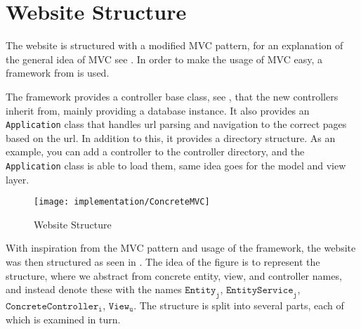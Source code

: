 \section{Website Structure}\label{sec:websitestructure}
The website is structured with a modified MVC pattern, for an explanation of the general idea of MVC see .
In order to make the usage of MVC easy, a framework from \citep{misc:mvc-framework} is used.

The framework provides a controller base class, see , that the new controllers inherit from, mainly providing a database instance.
It also provides an \texttt{Application} class that handles url parsing and navigation to the correct pages based on the url.
In addition to this, it provides a directory structure. As an example, you can add a controller to the controller directory, and the \texttt{Application} class is able to load them, same idea goes for the model and view layer.

\begin{figure}
	\centering
	\texttt{[image: implementation/ConcreteMVC]}
	\caption{Website Structure}\label{fig:websitestructure}
\end{figure}

With inspiration from the MVC pattern and usage of the framework, the website was then structured as seen in .
The idea of the figure is to represent the structure, where we abstract from concrete entity, view, and controller names, and instead denote these with the names $\texttt{Entity}_\texttt{j}$, $\texttt{EntityService}_\texttt{j}$, $\texttt{ConcreteController}_\texttt{i}$, $\texttt{View}_\texttt{u}$.
The structure is split into several parts, each of which is examined in turn. 

